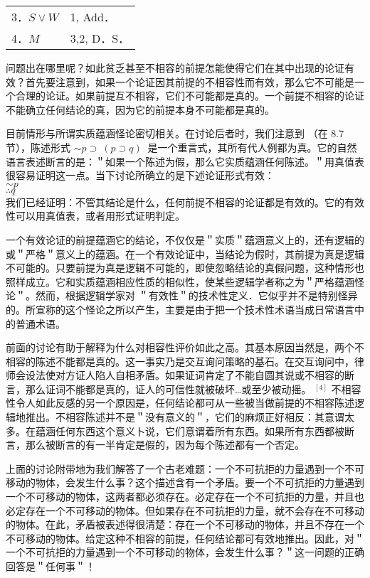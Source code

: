 \begin{center}
\begin{tabular}{ll}
3．$S \vee W$ & 1, Add． \\
4．$M$ & 3,2, D．S． \\
\end{tabular}
\end{center}

问题出在哪里呢？如此贫乏甚至不相容的前提怎能使得它们在其中出现的论证有效？首先要注意到，如果一个论证因其前提的不相容性而有效，那么它不可能是一个合理的论证。如果前提互不相容，它们不可能都是真的。一个前提不相容的论证不能确立任何结论的真，因为它的前提本身不可能都是真的。

目前情形与所谓实质蕴涵怪论密切相关。在讨论后者时，我们注意到 （在 8.7 节），陈述形式 $\sim p \supset ~(p \supset q) ~$ 是一个重言式，其所有代人例都为真。它的自然语言表述断言的是：＂如果一个陈述为假，那么它实质蕴涵任何陈述。＂用真值表很容易证明这一点。当下讨论所确立的是下述论证形式有效：\\
$\sim p$\\
$\therefore q$\\
我们已经证明：不管其结论是什么，任何前提不相容的论证都是有效的。它的有效性可以用真值表，或者用形式证明判定。

一个有效论证的前提蕴涵它的结论，不仅仅是＂实质＂蕴涵意义上的，还有逻辑的或＂严格＂意义上的蕴涵。在一个有效论证中，当结论为假时，其前提为真是逻辑不可能的。只要前提为真是逻辑不可能的，即使忽略结论的真假问题，这种情形也照样成立。它和实质蕴涵相应性质的相似性，使某些逻辑学者称之为＂严格蕴涵怪论＂。然而，根据逻辑学家对 ＂有效性＂的技术性定义．它似乎并不是特别怪异的。所宣称的这个怪论之所以产生，主要是由于把一个技术性术语当成日常语言中的普通术语。

前面的讨论有助于解释为什么对相容性评价如此之高。其基本原因当然是，两个不相容的陈述不能都是真的。这一事实乃是交互询问策略的基石。在交互询问中，律师会设法使对方证人陷人自相矛盾。如果证词肯定了不能自圆其说或不相容的断言，那么证词不能都是真的，证人的可信性就被破坏…或至少被动摇。 ${ }^{[4]}$ 不相容性令人如此反感的另一个原因是，任何结论都可从一些被当做前提的不相容陈述逻辑地推出。不相容陈述并不是＂没有意义的＂，它们的麻烦正好相反：其意谓太多。在蕴涵任何东西这个意义卜说，它们意谓着所有东西。如果所有东西都被断言，那么被断言的有一半肯定是假的，因为每个陈述都有一个否定。

上面的讨论附带地为我们解答了一个古老难题：一个不可抗拒的力量遇到一个不可移动的物体，会发生什么事？这个描述含有一个矛盾。要一个不可抗拒的力量遇到一个不可移动的物体，这两者都必须存在。必定存在一个不可抗拒的力量，并且也必定存在一个不可移动的物体。但如果存在不可抗拒的力量，就不会存在不可移动的物体。在此，矛盾被表述得很清楚：存在一个不可移动的物体，并且不存在一个不可移动的物体。给定这种不相容的前提，任何结论都可有效地推出。因此，对＂一个不可抗拒的力量遇到一个不可移动的物体，会发生什么事？＂这一问题的正确回答是＂任何事＂！

